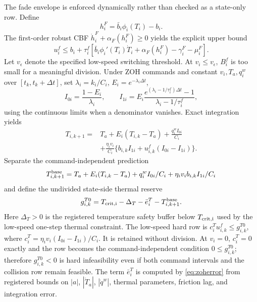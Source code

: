 The fade envelope is enforced dynamically rather than checked as a state-only row. Define
\begin{equation}
h_i^F=\bar b_i\phi_i(T_i)-b_i.
\end{equation}
The first-order robust CBF $\dot h_i^F+\alpha_F(h_i^F)\ge0$ yields the explicit upper bound
\begin{equation}\label{eq:fade_cbf}
u_i^f\le b_i+\tau_i^f\!\left[\bar b_i\phi_i'(T_i)\dot T_i
+\alpha_F(h_i^F)-\gamma_i^F-\mu_i^F\right].
\end{equation}
Let $v_\epsilon$ denote the specified low-speed switching threshold. At $v_i\le v_\epsilon$, $B_i^f$ is too small for a meaningful division. Under ZOH commands and constant $v_i,T_a,q_i^w$ over $[t_k,t_k+\Delta t]$, set $\lambda_i=k_i/C_i$, $E_i=e^{-\lambda_i\Delta t}$,
\begin{equation}
I_{0i}=\frac{1-E_i}{\lambda_i},\qquad
I_{1i}=E_i\frac{e^{(\lambda_i-1/\tau_i^f)\Delta t}-1}{\lambda_i-1/\tau_i^f},
\end{equation}
using the continuous limits when a denominator vanishes. Exact integration yields
\begin{align}
T_{i,k+1}={}&T_a+E_i(T_{i,k}-T_a)+\frac{q_i^wI_{0i}}{C_i}\nonumber\\
&+\frac{\eta_i v_i}{C_i}\{b_{i,k}I_{1i}+u_{i,k}^f(I_{0i}-I_{1i})\}.\label{eq:zohthermal}
\end{align}
Separate the command-independent prediction
\begin{equation}
T_{i,k+1}^{\rm base}=T_a+E_i(T_{i,k}-T_a)+q_i^wI_{0i}/C_i+\eta_i v_i b_{i,k}I_{1i}/C_i
\end{equation}
and define the undivided state-side thermal reserve
\begin{equation}\label{eq:gT0}
g_{i,k}^{T0}=T_{\rm crit,i}-\Delta_T-\bar e_i^T-T_{i,k+1}^{\rm base}.
\end{equation}
Here $\Delta_T>0$ is the registered temperature safety buffer below $T_{\rm crit,i}$ used by the low-speed one-step thermal constraint.
The low-speed hard row is $c_i^Tu_{i,k}^f\le g_{i,k}^{T0}$, where $c_i^T=\eta_iv_i(I_{0i}-I_{1i})/C_i$. It is retained without division. At $v_i=0$, $c_i^T=0$ exactly and the row becomes the command-independent condition $0\le g_{i,k}^{T0}$; therefore $g_{i,k}^{T0}<0$ is hard infeasibility even if both command intervals and the collision row remain feasible. The term $\bar e_i^T$ is computed by \eqref{eq:zoherror} from registered bounds on $|a|$, $|\dot T_a|$, $|\dot q^w|$, thermal parameters, friction lag, and integration error.

